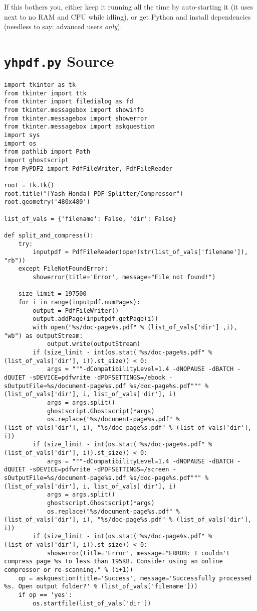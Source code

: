\documentclass[9pt]{report}
\begin{document}
If this bothers you, either keep it running all the time by
auto-starting it (it uses next to no RAM and CPU while idling), or
get Python and install dependencies (needless to say: advanced
users \emph{only}).

\chapter{\texttt{yhpdf.py} Source}
\label{sec:orgfa453e9}

\begin{verbatim}
import tkinter as tk
from tkinter import ttk
from tkinter import filedialog as fd
from tkinter.messagebox import showinfo
from tkinter.messagebox import showerror
from tkinter.messagebox import askquestion
import sys
import os
from pathlib import Path
import ghostscript
from PyPDF2 import PdfFileWriter, PdfFileReader

root = tk.Tk()
root.title("[Yash Honda] PDF Splitter/Compressor")
root.geometry('480x480')

list_of_vals = {'filename': False, 'dir': False}

def split_and_compress():
    try:
        inputpdf = PdfFileReader(open(str(list_of_vals['filename']), "rb"))
    except FileNotFoundError:
        showerror(title='Error', message="File not found!")

    size_limit = 197500
    for i in range(inputpdf.numPages):
        output = PdfFileWriter()
        output.addPage(inputpdf.getPage(i))
        with open("%s/doc-page%s.pdf" % (list_of_vals['dir'] ,i), "wb") as outputStream:
            output.write(outputStream)
        if (size_limit - int(os.stat("%s/doc-page%s.pdf" % (list_of_vals['dir'], i)).st_size)) < 0:
            args = """-dCompatibilityLevel=1.4 -dNOPAUSE -dBATCH -dQUIET -sDEVICE=pdfwrite -dPDFSETTINGS=/ebook -sOutputFile=%s/document-page%s.pdf %s/doc-page%s.pdf""" % (list_of_vals['dir'], i, list_of_vals['dir'], i)
            args = args.split()
            ghostscript.Ghostscript(*args)
            os.replace("%s/document-page%s.pdf" % (list_of_vals['dir'], i), "%s/doc-page%s.pdf" % (list_of_vals['dir'], i))
        if (size_limit - int(os.stat("%s/doc-page%s.pdf" % (list_of_vals['dir'], i)).st_size)) < 0:
            args = """-dCompatibilityLevel=1.4 -dNOPAUSE -dBATCH -dQUIET -sDEVICE=pdfwrite -dPDFSETTINGS=/screen -sOutputFile=%s/document-page%s.pdf %s/doc-page%s.pdf""" % (list_of_vals['dir'], i, list_of_vals['dir'], i)
            args = args.split()
            ghostscript.Ghostscript(*args)
            os.replace("%s/document-page%s.pdf" % (list_of_vals['dir'], i), "%s/doc-page%s.pdf" % (list_of_vals['dir'], i))
        if (size_limit - int(os.stat("%s/doc-page%s.pdf" % (list_of_vals['dir'], i)).st_size)) < 0:
            showerror(title='Error', message="ERROR: I couldn't compress page %s to less than 195KB. Consider using an online compressor or re-scanning." % (i+1))
    op = askquestion(title='Success', message='Successfully processed %s. Open output folder?' % (list_of_vals['filename']))
    if op == 'yes':
        os.startfile(list_of_vals['dir'])


\end{verbatim}
\end{document}
